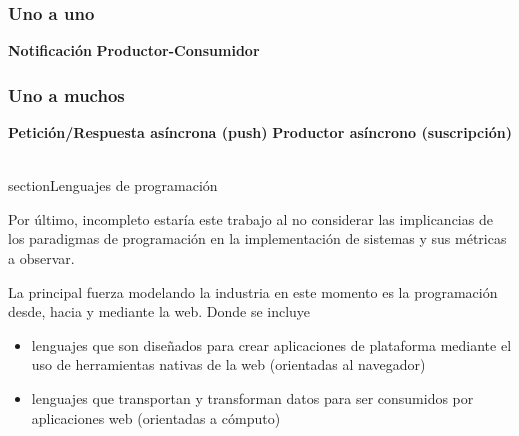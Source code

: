 \subsubsection{Uno a uno}
\textbf{Notificación}
\textbf{Productor-Consumidor}

\subsubsection{Uno a muchos}
\textbf{Petición/Respuesta asíncrona (push)}
\textbf{Productor asíncrono (suscripción)}

\\section{Lenguajes de programación} %
\label{sec:lenguajes_de_programación}

Por último, incompleto estaría este trabajo al no considerar las implicancias de los paradigmas de programación en la implementación de sistemas y sus métricas a observar.

La principal fuerza modelando la industria en este momento es la programación desde, hacia y mediante la web. Donde se incluye
\begin{itemize}
  \item lenguajes que son diseñados para crear aplicaciones de plataforma mediante el uso de herramientas nativas de la web (orientadas al navegador)
  \item lenguajes que transportan y transforman datos para ser consumidos por aplicaciones web (orientadas a cómputo)
\end{itemize}

